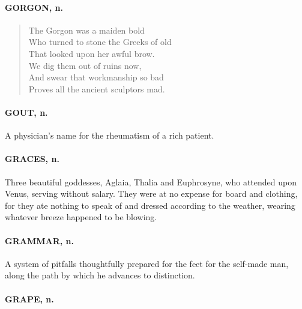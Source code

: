 \documentclass[11pt]{article}
\begin{document}
\paragraph{GORGON, n.}

\begin{quote}   The Gorgon was a maiden bold \\
  Who turned to stone the Greeks of old \\
  That looked upon her awful brow. \\
  We dig them out of ruins now, \\
  And swear that workmanship so bad \\
  Proves all the ancient sculptors mad.  \end{quote}

\paragraph{GOUT, n.}  A physician's name for the rheumatism of a rich patient.

\paragraph{GRACES, n.}  Three beautiful goddesses, Aglaia, Thalia and Euphrosyne,
who attended upon Venus, serving without salary.  They were at no
expense for board and clothing, for they ate nothing to speak of and
dressed according to the weather, wearing whatever breeze happened to
be blowing.

\paragraph{GRAMMAR, n.}  A system of pitfalls thoughtfully prepared for the feet
for the self-made man, along the path by which he advances to
distinction.

\paragraph{GRAPE, n.}
\end{document}

